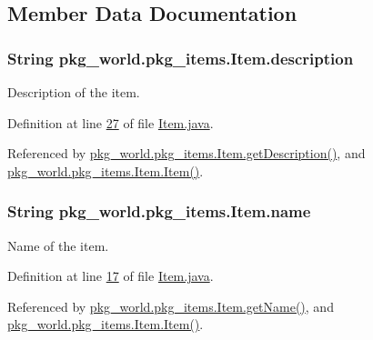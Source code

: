 \subsection{Member Data Documentation}
\hypertarget{classpkg__world_1_1pkg__items_1_1Item_a8c9a4a4ced5e41295c411fcdd1f3ec72}{
\subsubsection[{description}]{\setlength{\rightskip}{0pt plus 5cm}String pkg\-\_\-world.\-pkg\-\_\-items.\-Item.\-description\hspace{0.3cm}{\ttfamily [private]}}}\label{classpkg__world_1_1pkg__items_1_1Item_a8c9a4a4ced5e41295c411fcdd1f3ec72}


Description of the item. 



Definition at line \hyperlink{Item_8java_source_l00027}{27} of file \hyperlink{Item_8java_source}{Item.\-java}.



Referenced by \hyperlink{Item_8java_source_l00061}{pkg\-\_\-world.\-pkg\-\_\-items.\-Item.\-get\-Description()}, and \hyperlink{Item_8java_source_l00035}{pkg\-\_\-world.\-pkg\-\_\-items.\-Item.\-Item()}.

\hypertarget{classpkg__world_1_1pkg__items_1_1Item_ad4d60e860c8a6eb753f24a84cda24c60}{
\subsubsection[{name}]{\setlength{\rightskip}{0pt plus 5cm}String pkg\-\_\-world.\-pkg\-\_\-items.\-Item.\-name\hspace{0.3cm}{\ttfamily [private]}}}\label{classpkg__world_1_1pkg__items_1_1Item_ad4d60e860c8a6eb753f24a84cda24c60}


Name of the item. 



Definition at line \hyperlink{Item_8java_source_l00017}{17} of file \hyperlink{Item_8java_source}{Item.\-java}.



Referenced by \hyperlink{Item_8java_source_l00045}{pkg\-\_\-world.\-pkg\-\_\-items.\-Item.\-get\-Name()}, and \hyperlink{Item_8java_source_l00035}{pkg\-\_\-world.\-pkg\-\_\-items.\-Item.\-Item()}.

